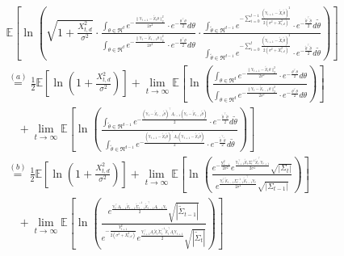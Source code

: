 \documentclass[twoside,11pt]{article}
\renewenvironment{proof}{\par\noindent{\bf Proof\ }}{\hfill\BlackBox\\[2mm]}
\newenvironment{proof}{\par\noindent{\bf Proof\ }}{\hfill\BlackBox\\[2mm]}
\def\proxytheta{\tilde{\theta}}
\def\E{\mathbb{E}}
\begin{document}
\begin{proof}
\begin{align*}
        & \E\left[\ln\left(\sqrt{1 + \frac{X_{t, d}^2}{\sigma^2}}\cdot\frac{\int_{\theta\in\Re^d}e^{-\frac{\|\mathbb{Y}_{t+1} - \tilde{\mathbb{X}}_{t}\theta\|^2_2}{2\sigma^2}}\cdot e^{-\frac{\theta^\top\theta}{2}}d\theta}{ \int_{\theta\in\Re^d}e^{-\frac{\|\mathbb{Y}_{t} - \tilde{\mathbb{X}}_{t-1}\theta\|^2_2}{2\sigma^2}}\cdot e^{-\frac{\theta^\top\theta}{2}}d\theta }\cdot \frac{\int_{\proxytheta\in\Re^{d-1}}e^{-\sum_{i=0}^{t-1}\frac{(\mathbb{Y}_{i+1} - \tilde{X}_{i}\proxytheta)^2}{2(\sigma^2 + X_{i,d}^2)}}\cdot e^{-\frac{\proxytheta^\top\proxytheta}{2}}d\proxytheta}{\int_{\proxytheta\in\Re^{d-1}}e^{-\sum_{i=0}^{t}\frac{(\mathbb{Y}_{i+1} - \tilde{X}_{i}\proxytheta)^2}{2(\sigma^2 + X_{i,d}^2)}}\cdot e^{-\frac{\proxytheta^\top\proxytheta}{2}}d\proxytheta}\right)\right]\\
        & \overset{(a)}{=} \frac{1}{2}\E\left[\ln\left(1 + \frac{X_{t, d}^2}{\sigma^2}\right)\right] + \lim_{t\rightarrow\infty}\E\left[\ln\left(\frac{\int_{\theta\in\Re^d}e^{-\frac{\|\mathbb{Y}_{t+1} - \tilde{\mathbb{X}}_{t}\theta\|^2_2}{2\sigma^2}}\cdot e^{-\frac{\theta^\top\theta}{2}}d\theta}{ \int_{\theta\in\Re^d}e^{-\frac{\|\mathbb{Y}_{t} - \tilde{\mathbb{X}}_{t-1}\theta\|^2_2}{2\sigma^2}}\cdot e^{-\frac{\theta^\top\theta}{2}}d\theta }\right)\right]\\
        &\quad + \lim_{t\rightarrow\infty}\E\left[\ln\left(\frac{\int_{\proxytheta\in\Re^{d-1}}e^{-\frac{(\mathbb{Y}_t-\tilde{\mathbb{X}}_{t-1}\proxytheta)^\top\Lambda_{t-1}(\mathbb{Y}_{t}-\tilde{\mathbb{X}}_{t-1}\proxytheta)}{2}}\cdot e^{-\frac{\proxytheta^\top\proxytheta}{2}}d\proxytheta}{\int_{\proxytheta\in\Re^{d-1}}e^{-\frac{(\mathbb{Y}_{t+1}-\tilde{\mathbb{X}}_{t}\proxytheta)^\top\Lambda_{t}(\mathbb{Y}_{t+1}-\tilde{\mathbb{X}}_{t}\proxytheta)}{2}}\cdot e^{-\frac{\proxytheta^\top\proxytheta}{2}}d\proxytheta}\right)\right]\\
        & \overset{(b)}{=} \frac{1}{2}\E\left[\ln\left(1 + \frac{X_{t, d}^2}{\sigma^2}\right)\right] + \lim_{t\rightarrow\infty}\E\left[\ln\left(\frac{e^{-\frac{Y_{t-1}^2}{2\sigma^2}}e^{\frac{\mathbb{Y}_{t+1}^\top\tilde{\mathbb{X}}_{t}\Sigma_t^{-1}\tilde{\mathbb{X}}_{t}^\top\mathbb{Y}_{t+1}}{2\sigma^4}}\sqrt{|\Sigma_t|}}{e^{\frac{\mathbb{Y}_t^\top\tilde{\mathbb{X}}_{t-1}\Sigma^{-1}_{t-1}\tilde{\mathbb{X}}_{t-1}^\top\mathbb{Y}_t}{2\sigma^4}}\sqrt{|\Sigma_{t-1}|}}\right)\right]\\
        &\quad + \lim_{t\rightarrow\infty}\E\left[\ln\left(\frac{e^{\frac{\mathbb{Y}_t^\top\Lambda_{t-1}\tilde{\mathbb{X}}_{t-1}\tilde{\Sigma}^{-1}_{t-1}\tilde{\mathbb{X}}_{t-1}^\top\Lambda_{t-1}\mathbb{Y}_t}{2}}\sqrt{|\tilde{\Sigma}_{t-1}|}}{e^{-\frac{Y^2_{t+1}}{2(\sigma^2 + X_{t,d}^2)}}e^{\frac{\mathbb{Y}_{t+1}^\top\Lambda_{t}\tilde{\mathbb{X}}_{t}\tilde{\Sigma}^{-1}_{t}\tilde{\mathbb{X}}_{t}^\top\Lambda_{t}\mathbb{Y}_{t+1}}{2}}\sqrt{|\tilde{\Sigma}_t|}}\right)\right]\\

\end{align*}
\end{proof}
\end{document}
